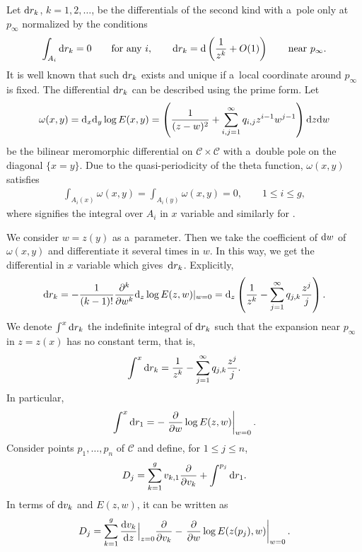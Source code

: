 \documentclass[pdftex]{sigma}
\numberwithin{equation}{section}
\theoremstyle{definition}
\begin{document}
Let ${\rm d}r_k$, $k=1,2,\dots $, be the differentials of the second kind with a~pole
only at $p_\infty$ normalized by the conditions
\begin{gather*}
\int_{A_i} {\rm d}r_k=0\qquad \text{for any $i$},
\qquad
{\rm d}r_k={\rm d}\left(\frac{1}{z^k}+O(1)\right) \qquad \text{near $p_\infty$}.
\end{gather*}
It is well known that such ${\rm d}r_k$ exists and unique if a~local coordinate around $p_\infty$ is fixed. The differential ${\rm d}r_k$ can be described using the prime form.
Let
\begin{gather*}
\omega(x,y)={\rm d}_x{\rm d}_y\log E(x,y)=\left( \frac{1}{(z-w)^2}+\sum_{i,j=1}^\infty q_{i,j}z^{i-1}w^{j-1}\right){\rm d}z{\rm d}w
\end{gather*}
be the bilinear meromorphic differential on ${\mathcal C}\times {\mathcal C}$ with a~double pole
on the diagonal $\{x=y\}$.
Due to the quasi-periodicity of the theta function, $\omega(x,y)$ satisfies
\begin{gather*}
\int_{A_i(x)}\omega(x,y)=\int_{A_i(y)}\omega(x,y)=0,
\qquad
1\leq i\leq g,
\end{gather*}
where  signifies the integral over $A_i$ in $x$ variable and similarly
for .

We consider $w=z(y)$ as a~parameter.
Then we take the coefficient of ${\rm d}w$ of $\omega(x,y)$ and differentiate it several times in $w$.
In this way, we get the differential in $x$ variable which gives~${\rm d}r_k$. Explicitly,
\begin{gather}
{\rm d}r_k=-\frac{1}{(k-1)!}\frac{\partial^{k}}{\partial w^{k}}{\rm d}_z\log E(z,w)\vert_{w=0}
={\rm d}_z\left(\frac{1}{z^k}-\sum_{j=1}^\infty q_{j,k}\frac{z^j}{j}\right).
\label{drk-prime form}
\end{gather}
We denote $ \int^{x}{\rm d}r_k$ the indefinite integral of ${\rm d}r_k$ such that
the expansion near $p_\infty$ in $z=z(x)$ has no constant term, that is,
\[
\int^x {\rm d}r_k=\frac{1}{z^k}-\sum_{j=1}^\infty q_{j,k}\frac{z^j}{j}.
\]
In particular, \[
\int^x {\rm d}r_1=-\left.\frac{\partial}{\partial w}\log E(z,w)\right|_{w=0}.
\]
Consider points $p_1,\dots ,p_n$ of ${\mathcal C}$ and define, for $1\leq j\leq n$,
\begin{gather}
D_j
=\sum_{k=1}^g v_{k,1}\frac{\partial}{\partial v_k}+\int^{p_j} {\rm d}r_1.
\label{Dj-1}
\end{gather}
In terms of ${\rm d}v_k$ and $E(z,w)$, it can be written as
\begin{gather}
D_j=\sum_{k=1}^g \frac{{\rm d}v_k}{{\rm d}z}\Big|_{z=0}\frac{\partial}{\partial v_k}
-\left.\frac{\partial}{\partial w}\log E(z(p_j),w)\right|_{w=0}.
\label{Dj-2}
\end{gather}
\end{document}
